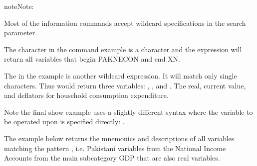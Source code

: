 \documentclass[letterpaper,10pt,english]{jupyterBook}
\begin{document}
\begin{sphinxadmonition}{note}{Note:}
\sphinxAtStartPar
{}

\sphinxAtStartPar
Most of the information commands accept wildcard specifications in the search parameter.

\sphinxAtStartPar
The \sphinxcode{\sphinxupquote{*}} character in the command  example is a  character and the expression will return all variables that begin PAKNECON and end XN.

\sphinxAtStartPar
The  in the  example is another wildcard expression. It will match only single characters.  Thus   would return three variables: , , and .  The real, current value, and deflators for household consumption expenditure.

\sphinxAtStartPar
Note the final show example uses a slightly different syntax where the variable to be operated upon is specified directly: .
\end{sphinxadmonition}

\sphinxAtStartPar
The example below returns the mnemonics and descriptions of all variables matching the pattern , i.e. Pakistani variables from the National Income Accounts from the main sub\sphinxhyphen{}category GDP that are also real variables.
\end{document}
